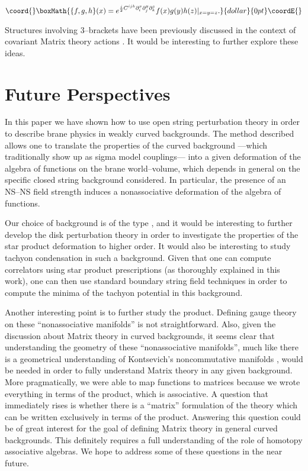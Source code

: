 \documentclass[a4paper,11pt]{article}
\begin{document}
$$\coord{}\boxMath{
\{ f,g,h \} (x) = e^{{i \over 2} C^{ijk} \partial^{x}_{i} \partial^{y}_{j}
\partial^{z}_{k}} f(x) g(y) h (z) |_{x=y=z}.
}{dollar}{0pt}\coordE{}$$

\noindent
Structures involving 3--brackets have been previously discussed in the
context of covariant Matrix theory actions \cite{Minic}. It would be
interesting to further explore these ideas.


\section{Future Perspectives}


In this paper we have shown how to use open string perturbation theory in
order to describe brane physics in weakly curved backgrounds. The method
described allows one to translate the properties of the curved background
---which traditionally show up as sigma model couplings--- into a given
deformation of the algebra of functions on the brane world--volume, which
depends in general on the specific closed string background considered. In
particular, the presence of an NS--NS field strength \coordHE{} induces a
nonassociative deformation of the algebra of functions.

Our choice of background is of the type \coordHE{}, and it
would be interesting to further develop the disk perturbation theory in
order to investigate the properties of the star product deformation to
higher order. It would also be interesting to study tachyon condensation in
such a background. Given that one can compute correlators using star
product prescriptions (as thoroughly explained in this work), one can then
use standard boundary string field techniques in order to compute the
minima of the tachyon potential in this background.

Another interesting point is to further study the \myHighlight{$\bullet$}\coordHE{} product.
Defining gauge theory on these ``nonassociative manifolds'' is not
straightforward. Also, given the discussion about Matrix theory in curved
backgrounds, it seems clear that understanding the geometry of these
``nonassociative manifolds'', much like there is a geometrical
understanding of Kontsevich's noncommutative manifolds \cite{BFFLS,
Fedosov, JSW}, would be needed in order to fully understand Matrix theory
in any given background. More pragmatically, we were able to map functions
to matrices because we wrote everything in terms of the \myHighlight{$\star$}\coordHE{} product,
which is associative. A question that immediately rises is whether there is
a ``matrix'' formulation of the theory which can be written exclusively in
terms of the \myHighlight{$\bullet$}\coordHE{} product. Answering this question could be of great
interest for the goal of defining Matrix theory in general curved
backgrounds. This definitely requires a full understanding of the role of
homotopy associative algebras. We hope to address some of these questions
in the near future.
\end{document}
